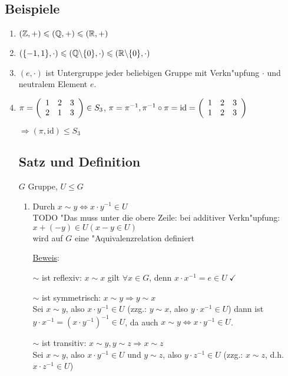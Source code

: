 \subsection{Beispiele}
\begin{enumerate}
	\item
	$(\Z, +) \leqslant (\Q, +) \leqslant (\R, +)$
	
	\item
	$(\{-1,1\}, \cdot) \leqslant (\Q \backslash \{0\}, \cdot) \leqslant (\R \backslash \{0\}, \cdot)$
	
	\item
	$(e, \cdot)$ ist Untergruppe jeder beliebigen Gruppe mit Verkn"upfung $\cdot$ und neutralem Element $e$.
	
	\item
	$\pi =
	\aMatrix{ccc}{
		1 & 2 & 3 \\
		2 & 1 & 3
		}
	\in S_3
	$,
	$\pi = \pi^{-1}, \pi^{-1} \circ \pi = \text{id} =
	\aMatrix{ccc}{
		1 & 2 & 3 \\
		1 & 2 & 3
		}
	$
	
	$\Rightarrow (\pi, \text{id})\leqslant S_3$
	
	\subsection{Satz und Definition}
	$G$ Gruppe, $U \leqslant G$
	\begin{enumerate}
		\item
		Durch $x \sim y \Leftrightarrow x \cdot y^{-1} \in U$\\
		TODO "Das muss unter die obere Zeile: bei additiver Verkn"upfung: $x + (-y) \in U (x-y \in U)$\\
		wird auf $G$ eine "Aquivalenzrelation definiert
		
		\underline{Beweis}:
		
		$\sim$ ist reflexiv: $x \sim x$ gilt $\forall x \in G$, denn $x \cdot x^{-1}= e \in U \; \checkmark$
		
		$\sim$ ist symmetrisch: $x \sim y \Rightarrow y \sim x$\\
		 Sei $x \sim y$, also $x \cdot y^{-1} \in U$ (zzg.: $y \sim x$, also $y \cdot x^{-1} \in U$) dann ist $y \cdot x^{-1} = (x \cdot y^{-1})^{-1} \in U$, da auch $x \sim y \Leftrightarrow x \cdot y^{-1} \in U$.
		 
		$\sim$ ist transitiv: $x \sim y, y \sim z \Rightarrow x \sim z$\\
		Sei $x \sim y$, also $x \cdot y^{-1} \in U$ und $y \sim z$, also $y \cdot z^{-1} \in U$ (zzg.: $x \sim z$, d.h. $x\cdot z^{-1} \in U$)
		

\end{enumerate}
\end{enumerate}
